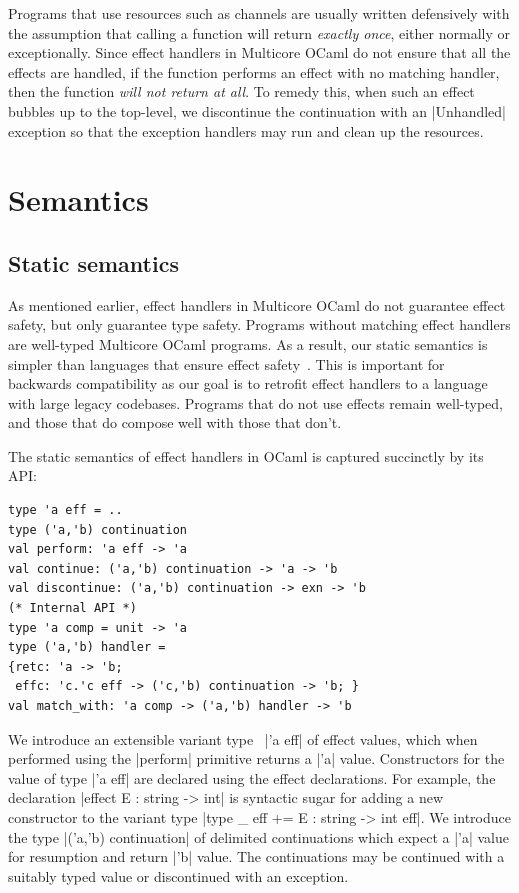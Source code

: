 \documentclass[sigplan,10pt,review,anonymous]{acmart}\settopmatter{printfolios=true,printccs=false,printacmref=false}
\begin{document}
Programs that use resources such as channels are usually written defensively
with the assumption that calling a function will return \emph{exactly once},
either normally or exceptionally. Since effect handlers in Multicore OCaml do
not ensure that all the effects are handled, if the function performs an effect
with no matching handler, then the function \emph{will not return at all}. To
remedy this, when such an effect bubbles up to the top-level, we discontinue the
continuation with an |Unhandled| exception so that the exception handlers may
run and clean up the resources.

\section{Semantics}
\label{sec:semantics}

\subsection{Static semantics}
\label{sec:static_semantics}

As mentioned earlier, effect handlers in Multicore OCaml do not guarantee
effect safety, but only guarantee type safety. Programs without matching effect
handlers are well-typed Multicore OCaml programs. As a result, our static
semantics is simpler than languages that ensure effect
safety~\cite{Hillerstrom20,Leijen14,Effekt,Frank,Biernacki19}. This is important for
backwards compatibility as our goal is to retrofit effect handlers to a
language with large legacy codebases. Programs that do not use effects remain
well-typed, and those that do compose well with those that don't.

The static semantics of effect handlers in OCaml is captured succinctly by its
API:
\begin{lstlisting}
type 'a eff = ..
type ('a,'b) continuation
val perform: 'a eff -> 'a
val continue: ('a,'b) continuation -> 'a -> 'b
val discontinue: ('a,'b) continuation -> exn -> 'b
(* Internal API *)
type 'a comp = unit -> 'a
type ('a,'b) handler =
{retc: 'a -> 'b;
 effc: 'c.'c eff -> ('c,'b) continuation -> 'b; }
val match_with: 'a comp -> ('a,'b) handler -> 'b
\end{lstlisting}
We introduce an extensible variant type~\cite{ExtVariants} |'a eff| of effect
values, which when performed using the |perform| primitive returns a |'a|
value. Constructors for the value of type |'a eff| are declared using the
effect declarations. For example, the declaration |effect E : string -> int|
is syntactic sugar for adding a new constructor to the variant type
|type _ eff += E : string -> int eff|. We introduce the type
|('a,'b) continuation| of delimited continuations which expect a |'a| value for
resumption and return |'b| value. The continuations may be continued with a
suitably typed value or discontinued with an exception.
\end{document}
